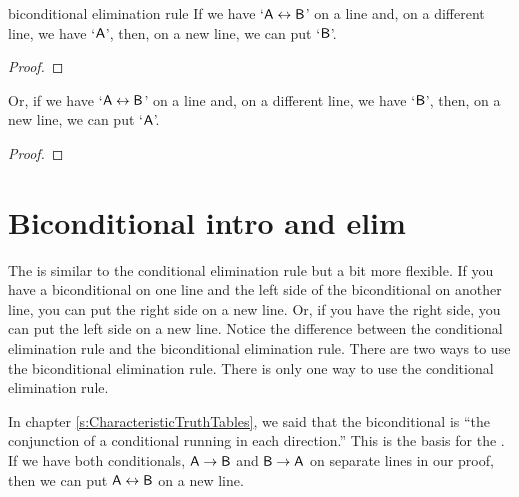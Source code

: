 \begin{factboxy}{biconditional elimination rule}\label{be-rule}
\small{If we have `$\mathsf{A}\leftrightarrow\mathsf{B}$' on a line and, on a different line, we have `$\mathsf{A}$', then, on a new line, we can put `$\mathsf{B}$'.}

\begin{proof}
	 
\end{proof}

\small{Or, if we have `$\mathsf{A}\leftrightarrow\mathsf{B}$' on a line and, on a different line, we have `$\mathsf{B}$', then, on a new line, we can put `$\mathsf{A}$'.} 

\begin{proof}
	 
\end{proof}

\end{factboxy}



\section{Biconditional intro and elim}\label{s:bi-rules}

The  is similar to the conditional elimination rule but a bit more flexible. If you have a biconditional on one line and the left side of the biconditional on another line, you can put the right side on a new line. Or, if you have the right side, you can put the left side on a new line. Notice the difference between the conditional elimination rule and the biconditional elimination rule. There are two ways to use the biconditional elimination rule. There is only one way to use the conditional elimination rule.

In chapter \ref{s:CharacteristicTruthTables}, we said that the biconditional is ``the conjunction of a conditional running in each direction.'' This is the basis for the . If we have both conditionals, $\mathsf{A} \rightarrow \mathsf{B}$ and $\mathsf{B} \rightarrow \mathsf{A}$ on separate lines in our proof, then we can put $\mathsf{A} \leftrightarrow \mathsf{B}$ on a new line.

